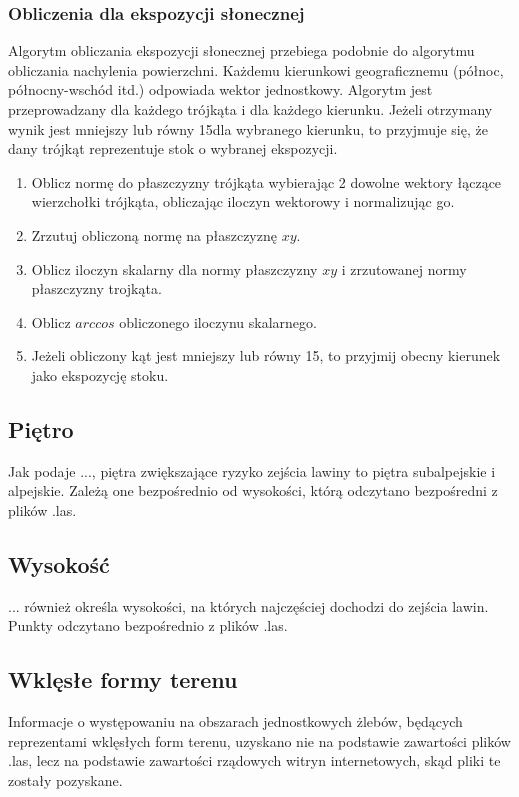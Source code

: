 \subsubsection{Obliczenia dla ekspozycji słonecznej}
Algorytm obliczania ekspozycji słonecznej przebiega podobnie do algorytmu obliczania nachylenia powierzchni. Każdemu kierunkowi geograficznemu (północ, północny-wschód itd.) odpowiada wektor jednostkowy. Algorytm jest przeprowadzany dla każdego trójkąta i dla każdego kierunku. Jeżeli otrzymany wynik jest mniejszy lub równy 15\degree dla wybranego kierunku, to przyjmuje się, że dany trójkąt reprezentuje stok o wybranej ekspozycji.

\begin{enumerate}
	\item Oblicz normę do płaszczyzny trójkąta wybierając 2 dowolne wektory łączące wierzchołki trójkąta, obliczając iloczyn wektorowy i normalizując go.
	\item Zrzutuj obliczoną normę na płaszczyznę $xy$.
	\item Oblicz iloczyn skalarny dla normy płaszczyzny $xy$ i zrzutowanej normy płaszczyzny trojkąta.
	\item Oblicz $arccos$ obliczonego iloczynu skalarnego.
	\item Jeżeli obliczony kąt jest mniejszy lub równy 15\degree, to przyjmij obecny kierunek jako ekspozycję stoku.
\end{enumerate} 

\subsection{Piętro}
Jak podaje ..., piętra zwiększające ryzyko zejścia lawiny to piętra subalpejskie i alpejskie. Zależą one bezpośrednio od wysokości, którą odczytano bezpośredni z plików .las.

\subsection{Wysokość}
... również określa wysokości, na których najczęściej dochodzi do zejścia lawin. Punkty odczytano bezpośrednio z plików .las.

\subsection{Wklęsłe formy terenu}
Informacje o występowaniu na obszarach jednostkowych żlebów, będących reprezentami wklęsłych form terenu, uzyskano nie na podstawie zawartości plików .las, lecz na podstawie zawartości rządowych witryn internetowych, skąd pliki te zostały pozyskane.

